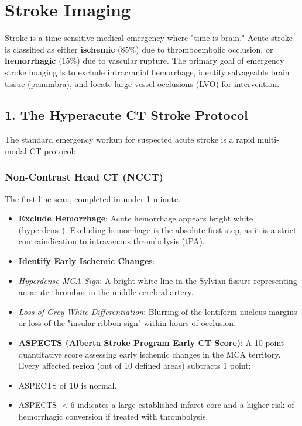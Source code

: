 \chapter{Stroke Imaging}

\label{ch:stroke_imaging}

Stroke is a time-sensitive medical emergency where "time is brain." Acute stroke is classified as either \textbf{ischemic} (85\%) due to thromboembolic occlusion, or \textbf{hemorrhagic} (15\%) due to vascular rupture. The primary goal of emergency stroke imaging is to exclude intracranial hemorrhage, identify salvageable brain tissue (penumbra), and locate large vessel occlusions (LVO) for intervention.


\section*{1. The Hyperacute CT Stroke Protocol}
The standard emergency workup for suspected acute stroke is a rapid multi-modal CT protocol:

\subsection*{Non-Contrast Head CT (NCCT)}
The first-line scan, completed in under 1 minute.
\begin{itemize}
    \item \textbf{Exclude Hemorrhage}: Acute hemorrhage appears bright white (hyperdense). Excluding hemorrhage is the absolute first step, as it is a strict contraindication to intravenous thrombolysis (tPA).
    \item \textbf{Identify Early Ischemic Changes}:
    \item \textit{Hyperdense MCA Sign}: A bright white line in the Sylvian fissure representing an acute thrombus in the middle cerebral artery.
    \item \textit{Loss of Grey-White Differentiation}: Blurring of the lentiform nucleus margins or loss of the "insular ribbon sign" within hours of occlusion.
    \item \textbf{ASPECTS (Alberta Stroke Program Early CT Score)}: A 10-point quantitative score assessing early ischemic changes in the MCA territory. Every affected region (out of 10 defined areas) subtracts 1 point:
    \item ASPECTS of \textbf{10} is normal.
    \item ASPECTS \textbf{$< 6$} indicates a large established infarct core and a higher risk of hemorrhagic conversion if treated with thrombolysis.
\end{itemize}

